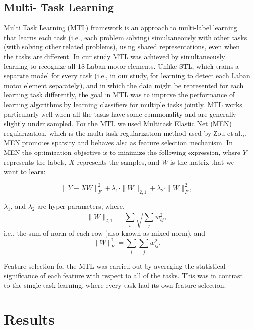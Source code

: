 \subsection{Multi- Task Learning}
Multi Task Learning (MTL) framework \cite{caruana1997multitask} is an approach
to multi-label learning that learns each task (i.e., each problem solving)
simultaneously with other
tasks (with solving other related problems), using shared representations, even
when the tasks are different. In our study MTL was achieved by simultaneously
learning to recognize all 18 Laban motor elements. Unlike STL, which trains a
separate model for every task (i.e., in our study, for learning to detect each
Laban motor element separately), and in which the data might be represented for
each learning task differently, the goal in MTL was to improve the performance
of learning algorithms by learning classifiers for multiple tasks jointly. MTL
works particularly well when all the tasks have some commonality and are
generally slightly under sampled. For the MTL we used Multitask Elastic Net
(MEN) regularization, which is the multi-task regularization method used by Zou
et al.,\cite{Zou}. MEN promotes sparsity and behaves also as feature selection
mechanism. In MEN the optimization objective is to minimize the following
expression, where $Y$ represents the labels, $X$ represents the samples, and $W$
is the matrix that we want to learn:

\begin{equation}\label{eq:MEN}
\|Y - XW\|^2_F+\lambda_1\cdot\|W\|_{2,1}+\lambda_2\cdot\|W\|^2_F,
\end{equation}

\noindent $\lambda_1$, and $\lambda_2$ are hyper-parameters, where,
\begin{equation}
\|W\|_{2,1} = \sum_i \sqrt{\sum_j w_{ij}^2},
\end{equation}
i.e., the sum of norm of each row (also known as mixed norm), and
\begin{equation}
\|W\|^2_F = \sum_i{\sum_j w_{ij}^2},
\end{equation}
\par Feature selection for the MTL was carried out by averaging the statistical
significance of each feature with respect to all of the tasks. This was in
contrast to the single task learning, where every task had its own feature
selection.

\section{Results}
